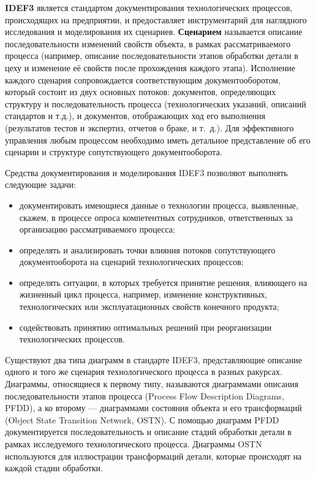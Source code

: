\textbf{IDEF3} является стандартом документирования технологических
процессов, происходящих на предприятии, и предоставляет инструментарий
для наглядного исследования и моделирования их сценариев.
\textbf{Сценарием} называется описание последовательности изменений свойств
объекта, в рамках рассматриваемого процесса (например, описание
последовательности этапов обработки детали в цеху и изменение её свойств
после прохождения каждого этапа).
Исполнение каждого сценария сопровождается соответствующим документооборотом,
который состоит из двух основных потоков: документов, определяющих структуру и
последовательность процесса (технологических указаний, описаний
стандартов и т.д.), и документов, отображающих ход его выполнения
(результатов тестов и экспертиз, отчетов о браке, и т.~д.).
Для эффективного управления любым процессом необходимо иметь детальное
представление об его сценарии и структуре сопутствующего документооборота.

Средства документирования и моделирования IDEF3 позволяют выполнять следующие
задачи:
\begin{itemize}
  \item документировать имеющиеся данные о технологии процесса,
  выявленные, скажем, в процессе опроса компетентных сотрудников,
  ответственных за организацию рассматриваемого процесса;
  \item определять и анализировать точки влияния потоков сопутствующего
  документооборота на сценарий технологических процессов;
  \item определять ситуации, в которых требуется принятие решения,
  влияющего на жизненный цикл процесса, например, изменение
  конструктивных, технологических или эксплуатационных свойств конечного
  продукта;
  \item содействовать принятию оптимальных решений при реорганизации
  технологических процессов.
\end{itemize}

Существуют два типа диаграмм в стандарте IDEF3, представляющие
описание одного и того же сценария технологического процесса в разных
ракурсах. Диаграммы, относящиеся к первому типу, называются
диаграммами описания последовательности этапов процесса
(Process Flow Description Diagrams, PFDD), а ко второму ---
диаграммами состояния объекта и его трансформаций
(Object State Transition Network, OSTN).
С помощью диаграмм PFDD документируется последовательность и
описание стадий обработки детали в рамках исследуемого технологического
процесса.
Диаграммы OSTN используются для иллюстрации трансформаций детали,
которые происходят на каждой стадии обработки.

